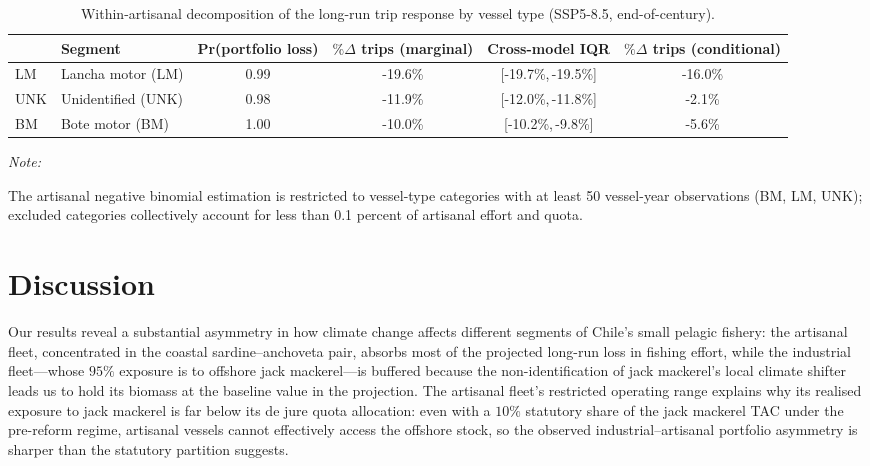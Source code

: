 \documentclass[
  11pt,
]{article}
\begin{document}
\begin{table}[!h]
\centering
\caption{\label{tab:tripcompstatemb}Within-artisanal decomposition of the long-run trip response by vessel type (SSP5-8.5, end-of-century).}
\centering
\fontsize{9}{11}\selectfont
\begin{threeparttable}
\begin{tabular}[t]{llcccc}
\toprule
  & Segment & Pr(portfolio loss) & $\%\Delta$ trips (marginal) & Cross-model IQR & $\%\Delta$ trips (conditional)\\
\midrule
LM & Lancha motor (LM) & 0.99 & -19.6\% & {}[-19.7\%,\,-19.5\%] & -16.0\%\\
UNK & Unidentified (UNK) & 0.98 & -11.9\% & {}[-12.0\%,\,-11.8\%] & -2.1\%\\
BM & Bote motor (BM) & 1.00 & -10.0\% & {}[-10.2\%,\,-9.8\%] & -5.6\%\\
\bottomrule
\end{tabular}
\begin{tablenotes}
\item \textit{Note:} 
\item The artisanal negative binomial estimation is restricted to vessel-type categories with at least 50 vessel-year observations (BM, LM, UNK); excluded categories collectively account for less than 0.1 percent of artisanal effort and quota.
\end{tablenotes}
\end{threeparttable}
\end{table}

\section{Discussion}\label{sec:discussion}

Our results reveal a substantial asymmetry in how climate change affects different segments of Chile's small pelagic fishery: the artisanal fleet, concentrated in the coastal sardine--anchoveta pair, absorbs most of the projected long-run loss in fishing effort, while the industrial fleet---whose \(95\%\) exposure is to offshore jack mackerel---is buffered because the non-identification of jack mackerel's local climate shifter leads us to hold its biomass at the baseline value in the projection. The artisanal fleet's restricted operating range explains why its realised exposure to jack mackerel is far below its de jure quota allocation: even with a \(10\%\) statutory share of the jack mackerel TAC under the pre-reform regime, artisanal vessels cannot effectively access the offshore stock, so the observed industrial--artisanal portfolio asymmetry is sharper than the statutory partition suggests.
\end{document}
